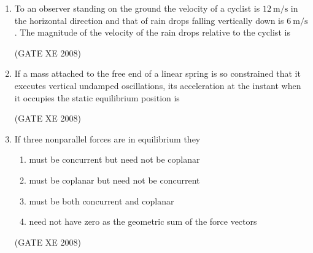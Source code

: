 \documentclass[12pt]{article}
\begin{document}
\begin{enumerate}
(GATE XE 2008)

\item To an observer standing on the ground the velocity of a cyclist is $12 \ \text{m/s}$ in the horizontal direction and that of rain drops falling vertically down is $6 \ \text{m/s}$. The magnitude of the velocity of the rain drops relative to the cyclist is  

\begin{enumerate}
\end{enumerate}

(GATE XE 2008)

\item If a mass attached to the free end of a linear spring is so constrained that it executes vertical undamped oscillations, its acceleration at the instant when it occupies the static equilibrium position is  

\begin{enumerate}
\end{enumerate}

(GATE XE 2008)

\item If three nonparallel forces are in equilibrium they  

\begin{enumerate}
\item  must be concurrent but need not be coplanar  
\item  must be coplanar but need not be concurrent  
\item  must be both concurrent and coplanar  
\item  need not have zero as the geometric sum of the force vectors  
\end{enumerate}

(GATE XE 2008)


\end{enumerate}
\end{document}
